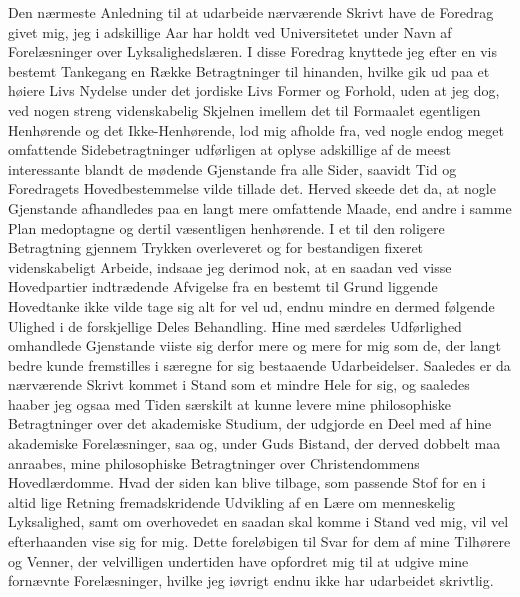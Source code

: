 \documentclass[12pt,a4paper]{book}
\newcommand{\opage}[1]{\marginnote{\footnotesize\textit{[#1]}}}
\begin{document}
Den nærmeste Anledning til at udarbeide nærværende Skrivt have de
Foredrag givet mig, jeg i adskillige Aar har holdt ved Universitetet
under Navn af Forelæsninger over Lyksalighedslæren. I disse Foredrag
knyttede jeg efter en vis bestemt Tankegang en Række Betragtninger til
hinanden, hvilke gik ud paa et høiere Livs Nydelse under det jordiske
Livs Former og Forhold, uden at jeg dog, ved nogen streng videnskabelig
Skjelnen imellem det til Formaalet egentligen Henhørende \opage{VI} og det
Ikke-Henhørende, lod mig afholde fra, ved nogle endog meget omfattende
Sidebetragtninger udførligen at oplyse adskillige af de meest
interessante blandt de mødende Gjenstande fra alle Sider, saavidt Tid
og Foredragets Hovedbestemmelse vilde tillade det. Herved skeede det
da, at nogle Gjenstande afhandledes paa en langt mere omfattende Maade,
end andre i samme Plan medoptagne og dertil væsentligen henhørende. I
et til den roligere Betragtning gjennem Trykken overleveret og for
bestandigen fixeret videnskabeligt Arbeide, indsaae jeg derimod nok, at
en saadan ved visse Hovedpartier indtrædende Afvigelse fra en bestemt
til Grund liggende Hovedtanke ikke vilde tage sig alt for vel ud, endnu
mindre en dermed følgende Ulighed i de forskjellige Deles Behandling.
Hine med særdeles Udførlighed omhandlede Gjenstande viiste sig derfor
mere og mere for mig som de, der langt bedre kunde fremstilles i
særegne for sig bestaaende Udarbeidelser. Saaledes er da nærværende
Skrivt kommet i Stand som et mindre Hele for sig, og saaledes haaber
jeg ogsaa med Tiden særskilt at kunne levere mine philosophiske
Betragtninger over det akademiske Studium, der udgjorde en Deel med af
hine akademiske Forelæsninger, saa og, under Guds Bistand, der derved
dobbelt maa anraabes, mine philosophiske Betragtninger over
Christendommens Hovedlærdomme. Hvad der siden kan blive tilbage, som
passende Stof for en i altid lige Retning fremadskridende Udvikling af
en Lære om menneskelig Lyksalighed, samt om overhovedet en saadan skal
komme i Stand ved mig, \opage{VII} vil vel efterhaanden vise sig for mig. Dette
foreløbigen til Svar for dem af mine Tilhørere og Venner, der
velvilligen undertiden have opfordret mig til at udgive mine fornævnte
Forelæsninger, hvilke jeg iøvrigt endnu ikke har udarbeidet skrivtlig.
\end{document}
